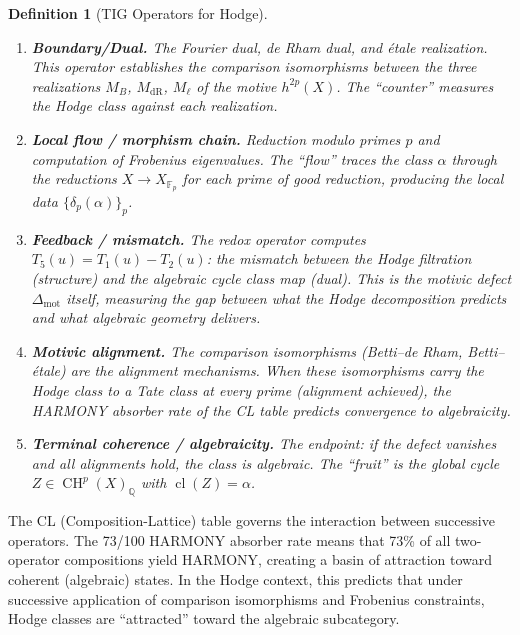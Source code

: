 \documentclass[11pt]{article}
\newtheorem{definition}[theorem]{Definition}
\theoremstyle{definition}
\DeclareMathOperator{\cl}{cl}
\DeclareMathOperator{\CH}{CH}
\begin{document}
\begin{definition}[TIG Operators for Hodge]
\label{def:tig-hodge}
\begin{enumerate}[leftmargin=2.5cm, labelsep=0.5cm]
  \item[$T_2$ (Counter):] \textbf{Boundary/Dual.}
    The Fourier dual, de Rham dual, and \'etale realization.  This operator
    establishes the comparison isomorphisms between the three realizations
    $M_B$, $M_{\mathrm{dR}}$, $M_\ell$ of the motive $h^{2p}(X)$.
    The ``counter'' measures the Hodge class against each realization.

  \item[$T_3$ (Progress):] \textbf{Local flow / morphism chain.}
    Reduction modulo primes $p$ and computation of Frobenius eigenvalues.
    The ``flow'' traces the class $\alpha$ through the reductions
    $X \to X_{\mathbb{F}_p}$ for each prime of good reduction, producing
    the local data $\{\delta_p(\alpha)\}_{p}$.

  \item[$T_5$ (Redox):] \textbf{Feedback / mismatch.}
    The redox operator computes $T_5(u) = T_1(u) - T_2(u)$: the mismatch
    between the Hodge filtration (structure) and the algebraic cycle class
    map (dual).  This is the motivic defect $\Delta_{\mathrm{mot}}$ itself,
    measuring the gap between what the Hodge decomposition predicts and what
    algebraic geometry delivers.

  \item[$T_7$ (Harmony):] \textbf{Motivic alignment.}
    The comparison isomorphisms (Betti--de Rham, Betti--\'etale) are the
    alignment mechanisms.  When these isomorphisms carry the Hodge class
    to a Tate class at every prime (alignment achieved), the HARMONY
    absorber rate of the CL table predicts convergence to algebraicity.

  \item[$T_9$ (Fruit):] \textbf{Terminal coherence / algebraicity.}
    The endpoint: if the defect vanishes and all alignments hold, the class
    is algebraic.  The ``fruit'' is the global cycle $Z \in \CH^p(X)_{\mathbb{Q}}$
    with $\cl(Z) = \alpha$.
\end{enumerate}
\end{definition}

The CL (Composition-Lattice) table governs the interaction between successive
operators.  The 73/100 HARMONY absorber rate means that 73\% of all
two-operator compositions yield HARMONY, creating a basin of attraction
toward coherent (algebraic) states.  In the Hodge context, this predicts
that under successive application of comparison isomorphisms and Frobenius
constraints, Hodge classes are ``attracted'' toward the algebraic subcategory.
\end{document}
